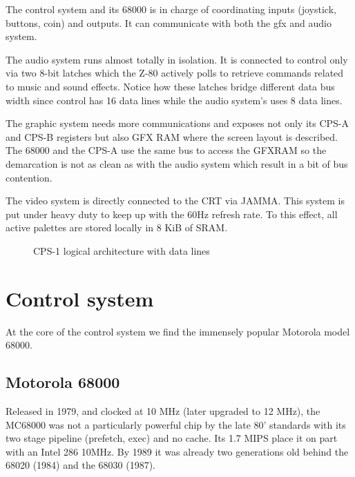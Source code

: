 
The control system and its 68000 is in charge of coordinating inputs (joystick, buttons, coin) and outputs. It can communicate with both the gfx and audio system.

The audio system runs almost totally in isolation. It is connected to control only via two 8-bit latches which the Z-80 actively polls to retrieve commands related to music and sound effects. Notice how these latches bridge different data bus width since control has 16 data lines while the audio system's uses 8 data lines.

The graphic system needs more communications and exposes not only its CPS-A and CPS-B registers but also GFX RAM where the screen layout is described. The 68000 and the CPS-A use the same bus to access the GFXRAM so the demarcation is not as clean as with the audio system which result in a bit of bus contention.  

The video system is directly connected to the CRT via JAMMA. This system is put under heavy duty to keep up with the 60Hz refresh rate. To this effect, all active palettes are stored locally in 8 KiB of SRAM.

\begin{figure}[H]
  \caption*{CPS-1 logical architecture with data lines}
  \label{cps1_arch}
  \end{figure}



\section{Control system}
At the core of the control system we find the immensely popular Motorola model 68000.

\subsection{Motorola 68000}

 Released in 1979, and clocked at 10 MHz (later upgraded to 12 MHz), the MC68000 was not a particularly powerful chip by the late 80' standards with its two stage pipeline\cite{M68000fv} (prefetch, exec) and no cache. Its 1.7 MIPS place it on part with an Intel 286 10MHz. By 1989 it was already two generations old behind the 68020 (1984) and the 68030 (1987).

